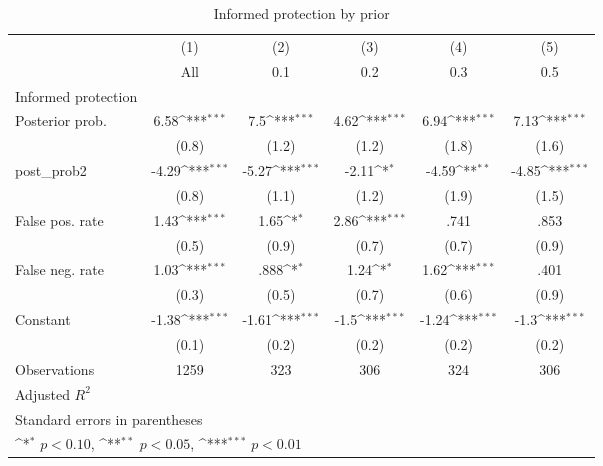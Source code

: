 \begin{table}[htbp]\centering
\def\sym#1{\ifmmode^{#1}\else\(^{#1}\)\fi}
\caption{Informed protection by prior}
\begin{tabular}{l*{5}{c}}
\hline\hline
                &\multicolumn{1}{c}{(1)}&\multicolumn{1}{c}{(2)}&\multicolumn{1}{c}{(3)}&\multicolumn{1}{c}{(4)}&\multicolumn{1}{c}{(5)}\\
                &\multicolumn{1}{c}{All}&\multicolumn{1}{c}{0.1}&\multicolumn{1}{c}{0.2}&\multicolumn{1}{c}{0.3}&\multicolumn{1}{c}{0.5}\\
\hline
Informed protection&                  &                  &                  &                  &                  \\
Posterior prob. &     6.58\sym{***}&      7.5\sym{***}&     4.62\sym{***}&     6.94\sym{***}&     7.13\sym{***}\\
                &    (0.8)         &    (1.2)         &    (1.2)         &    (1.8)         &    (1.6)         \\
post\_prob2      &    -4.29\sym{***}&    -5.27\sym{***}&    -2.11\sym{*}  &    -4.59\sym{**} &    -4.85\sym{***}\\
                &    (0.8)         &    (1.1)         &    (1.2)         &    (1.9)         &    (1.5)         \\
False pos. rate &     1.43\sym{***}&     1.65\sym{*}  &     2.86\sym{***}&     .741         &     .853         \\
                &    (0.5)         &    (0.9)         &    (0.7)         &    (0.7)         &    (0.9)         \\
False neg. rate &     1.03\sym{***}&     .888\sym{*}  &     1.24\sym{*}  &     1.62\sym{***}&     .401         \\
                &    (0.3)         &    (0.5)         &    (0.7)         &    (0.6)         &    (0.9)         \\
Constant        &    -1.38\sym{***}&    -1.61\sym{***}&     -1.5\sym{***}&    -1.24\sym{***}&     -1.3\sym{***}\\
                &    (0.1)         &    (0.2)         &    (0.2)         &    (0.2)         &    (0.2)         \\
\hline
Observations    &     1259         &      323         &      306         &      324         &      306         \\
Adjusted \(R^{2}\)&                  &                  &                  &                  &                  \\
\hline\hline
\multicolumn{6}{l}{\footnotesize Standard errors in parentheses}\\
\multicolumn{6}{l}{\footnotesize \sym{*} \(p<0.10\), \sym{**} \(p<0.05\), \sym{***} \(p<0.01\)}\\
\end{tabular}
\end{table}
